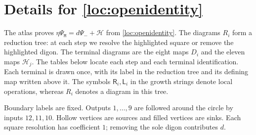 \documentclass[a4paper,11pt]{amsart}
\newcommand{\wordmiddle}{\mathtt{M}}
\newcommand{\middlemap}{{\Psi}_{{\wordmiddle}}}
\newcommand{\removemap}{{\Psi}_-}
\numberwithin{equation}{subsection}
\theoremstyle{plain}
\theoremstyle{definition}
\theoremstyle{remark}
\begin{document}
\section{Details for \autoref{loc:openidentity}}\label{loc:atlasappendix}

\addtocounter{subsection}{1}

The atlas proves $\eta \middlemap=d\removemap+\mathcal H$ from
\autoref{loc:openidentity}. The diagrams $R_i$ form a reduction
tree: at each step we resolve the highlighted square or remove the
highlighted digon. The terminal diagrams are the eight maps $D_i$
and the eleven maps $\mathcal H_j$. The tables below locate each step and
each terminal identification. Each terminal is drawn once, with
its label in the reduction tree and its defining map written above it. The symbols $\mathsf R_i,\mathsf L_i$
in the growth strings denote local operations, whereas $R_i$ denotes
a diagram in this tree.

Boundary labels are fixed. Outputs $1,\ldots,9$ are followed around
the circle by inputs $12,11,10$. Hollow vertices are sources and
filled vertices are sinks. Each square resolution has coefficient
$1$; removing the sole digon contributes $d$.
\end{document}
